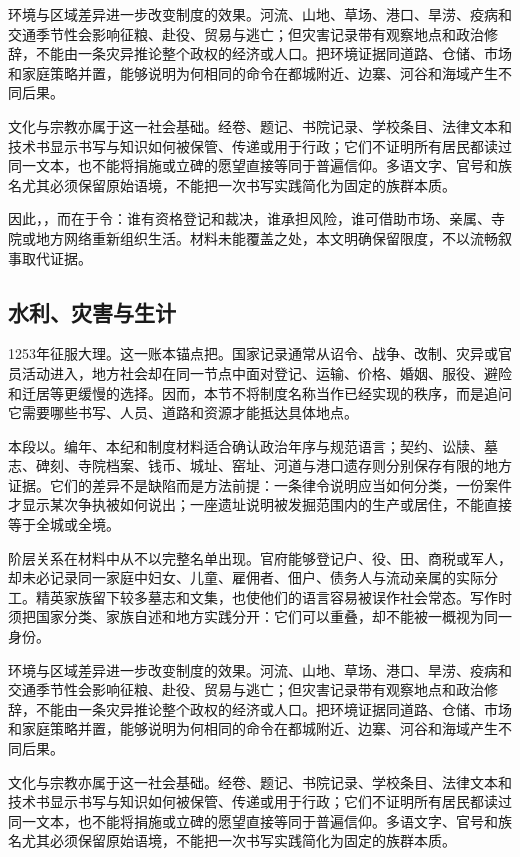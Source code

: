 环境与区域差异进一步改变制度的效果。河流、山地、草场、港口、旱涝、疫病和交通季节性会影响征粮、赴役、贸易与逃亡；但灾害记录带有观察地点和政治修辞，不能由一条灾异推论整个政权的经济或人口。把环境证据同道路、仓储、市场和家庭策略并置，能够说明为何相同的命令在都城附近、边寨、河谷和海域产生不同后果。

文化与宗教亦属于这一社会基础。经卷、题记、书院记录、学校条目、法律文本和技术书显示书写与知识如何被保管、传递或用于行政；它们不证明所有居民都读过同一文本，也不能将捐施或立碑的愿望直接等同于普遍信仰。多语文字、官号和族名尤其必须保留原始语境，不能把一次书写实践简化为固定的族群本质。

因此，，而在于令：谁有资格登记和裁决，谁承担风险，谁可借助市场、亲属、寺院或地方网络重新组织生活。材料未能覆盖之处，本文明确保留限度，不以流畅叙事取代证据。

\subsection{水利、灾害与生计}

1253年征服大理。这一账本锚点把。国家记录通常从诏令、战争、改制、灾异或官员活动进入，地方社会却在同一节点中面对登记、运输、价格、婚姻、服役、避险和迁居等更缓慢的选择。因而，本节不将制度名称当作已经实现的秩序，而是追问它需要哪些书写、人员、道路和资源才能抵达具体地点。

本段以。编年、本纪和制度材料适合确认政治年序与规范语言；契约、讼牍、墓志、碑刻、寺院档案、钱币、城址、窑址、河道与港口遗存则分别保存有限的地方证据。它们的差异不是缺陷而是方法前提：一条律令说明应当如何分类，一份案件才显示某次争执被如何说出；一座遗址说明被发掘范围内的生产或居住，不能直接等于全城或全境。

阶层关系在材料中从不以完整名单出现。官府能够登记户、役、田、商税或军人，却未必记录同一家庭中妇女、儿童、雇佣者、佃户、债务人与流动亲属的实际分工。精英家族留下较多墓志和文集，也使他们的语言容易被误作社会常态。写作时须把国家分类、家族自述和地方实践分开：它们可以重叠，却不能被一概视为同一身份。

环境与区域差异进一步改变制度的效果。河流、山地、草场、港口、旱涝、疫病和交通季节性会影响征粮、赴役、贸易与逃亡；但灾害记录带有观察地点和政治修辞，不能由一条灾异推论整个政权的经济或人口。把环境证据同道路、仓储、市场和家庭策略并置，能够说明为何相同的命令在都城附近、边寨、河谷和海域产生不同后果。

文化与宗教亦属于这一社会基础。经卷、题记、书院记录、学校条目、法律文本和技术书显示书写与知识如何被保管、传递或用于行政；它们不证明所有居民都读过同一文本，也不能将捐施或立碑的愿望直接等同于普遍信仰。多语文字、官号和族名尤其必须保留原始语境，不能把一次书写实践简化为固定的族群本质。

